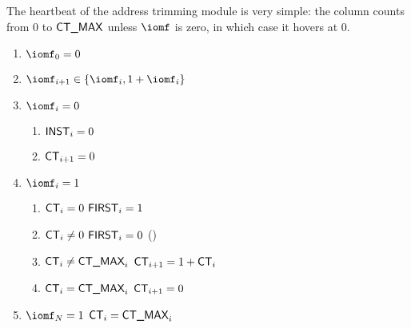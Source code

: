 The heartbeat of the address trimming module is very simple: the \ct{} column counts from $0$ to $\textsf{CT\_MAX}$ unless $\iomf$ is zero, in which case it hovers at $0$.
\begin{enumerate}
    \item $\iomf_{0} = 0$
    \item $\iomf_{i + 1} \in \{ \iomf_{i}, 1 + \iomf_{i} \}$
    \item \If $\iomf_{i} = 0$ \Then
	\begin{enumerate}
	    \item $\textsf{INST}_{i}           = 0 $
	    \item $\textsf{CT}_{i+1}           = 0 $
	\end{enumerate}
    \item \If $\iomf_{i} = 1$ \Then
	\begin{enumerate}
	    \item \If $\textsf{CT}_{i} =    0$ \Then $\textsf{FIRST}_{i} = 1$
	    \item \If $\textsf{CT}_{i} \neq 0$ \Then $\textsf{FIRST}_{i} = 0$ (\trash)
	    \item \If $\textsf{CT}_{i} \neq \textsf{CT\_MAX}_{i}$ \Then $\textsf{CT}_{i + 1} = 1 + \textsf{CT}_{i}$
	    \item \If $\textsf{CT}_{i} = \textsf{CT\_MAX}_{i}$ \Then $\textsf{CT}_{i + 1} = 0$
	\end{enumerate}
    \item \If $\iomf_{N} = 1$ \Then $\textsf{CT}_{i} = \textsf{CT\_MAX}_{i}$
\end{enumerate}
